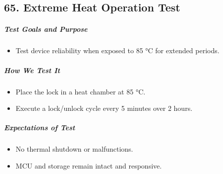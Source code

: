 \subsection*{65. Extreme Heat Operation Test}
\subparagraph{Test Goals and Purpose}
\begin{itemize}
    \item Test device reliability when exposed to 85 °C for extended periods.
\end{itemize}
\subparagraph{How We Test It}
\begin{itemize}
    \item Place the lock in a heat chamber at 85 °C.
    \item Execute a lock/unlock cycle every 5 minutes over 2 hours.
\end{itemize}
\subparagraph{Expectations of Test}
\begin{itemize}
    \item No thermal shutdown or malfunctions.
    \item MCU and storage remain intact and responsive.
\end{itemize}

